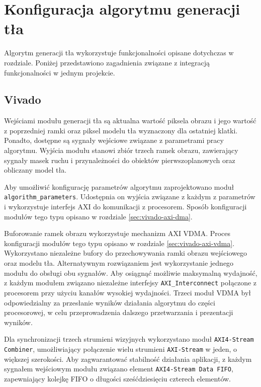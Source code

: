 
\section{Konfiguracja algorytmu generacji tła}
\label{sec:background-buffer-conf}

Algorytm generacji tła wykorzystuje funkcjonalności opisane dotychczas w rozdziale. Poniżej przedstawiono zagadnienia związane z integracją funkcjonalności w jednym projekcie.

\subsection{Vivado}

Wejściami modułu generacji tła są aktualna wartość piksela obrazu i jego wartość z poprzedniej ramki oraz piksel modelu tła wyznaczony dla ostatniej klatki. Ponadto, dostępne są sygnały wejściowe związane z parametrami pracy algorytmu. Wyjścia modułu stanowi zbiór trzech ramek obrazu, zawierający sygnały masek ruchu i przynależności do obiektów pierwszoplanowych oraz obliczany model tła.

Aby umożliwić konfigurację parametrów algorytmu zaprojektowano moduł \texttt{algorithm\_parameters}. Udostępnia on wyjścia związane z każdym z parametrów i wykorzystuje interfejs AXI do komunikacji z procesorem. Sposób konfiguracji modułów tego typu opisano w rozdziale \ref{sec:vivado-axi-dma}.

Buforowanie ramek obrazu wykorzystuje mechanizm AXI VDMA. Proces konfiguracji modułów tego typu opisano w rozdziale \ref{sec:vivado-axi-vdma}. Wykorzystano niezależne bufory do przechowywania ramki obrazu wejściowego oraz modelu tła. Alternatywnym rozwiązaniem jest wykorzystanie jednego modułu do obsługi obu sygnałów. Aby osiągnąć możliwie maksymalną wydajność, z każdym modułem związano niezależne interfejsy \texttt{AXI\_Interconnect} połączone z procesorem przy użyciu kanałów wysokiej wydajności.
Trzeci moduł VDMA był odpowiedzialny za przesłanie wyników działania algorytmu do części procesorowej, w celu przeprowadzenia dalszego przetwarzania i prezentacji wyników.

Dla  synchronizacji trzech strumieni wizyjnych wykorzystano moduł \texttt{AXI4-Stream Combiner}, umożliwiający połączenie wielu strumieni \texttt{AXI-Stream} w jeden, o większej szerokości. Aby zagwarantować stabilność działania aplikacji, z każdym sygnałem wejściowym modułu związano element \texttt{AXI4-Stream Data FIFO}, zapewniający kolejkę FIFO o długości sześćdziesięciu czterech elementów.

